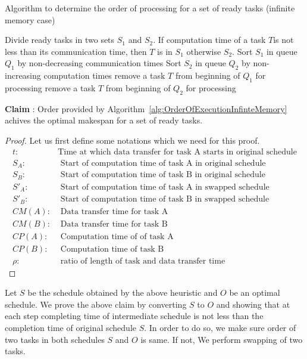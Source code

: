 \documentclass[runningheads]{llncs} %
\begin{document}
	
	\begin{algorithm}
	\caption{\label{alg:OrderOfExecutionInfinteMemory}Algorithm to determine the order of processing for a set of ready tasks (infinite memory case)}
	\begin{algorithmic}[1]
		\STATE Divide ready tasks in two sets $S_1$ and $S_2$. If computation time of a task $T$is not less than its communication time, then $T$ is in $S_1$ otherwise $S_2$.
		\STATE Sort $S_1$ in queue $Q_1$ by non-decreasing communication times
		\STATE Sort $S_2$ in queue $Q_2$ by non-increasing computation times
		\STATE remove a task $T$ from beginning of $Q_1$ for processing
		\ELSE 
		\STATE remove a task $T$ from beginning of $Q_2$ for processing
		\ENDIF
		\ENDWHILE
	\end{algorithmic}
\end{algorithm}
	
	
	\noindent \textbf{Claim} : Order provided by Algorithm~\ref{alg:OrderOfExecutionInfinteMemory} achives the optimal makespan for a set of ready tasks.
	\begin{proof}
		Let us first define some notations which we need for this proof.
		\begin{align*}
		t : & \text{Time at which data transfer for task A starts in original schedule}\\
		S_A : & \text{ Start of computation  time of task A in original schedule}\\
		S_B : & \text{ Start of computation time of task B in original schedule}\\
		S'_A : & \text{ Start of computation time of task A in swapped schedule}\\
		S'_B : & \text{ Start of computation time of task B in swapped schedule}\\
		CM(A) : & \text{ Data transfer time for task A}\\
		CM(B) : & \text{ Data transfer time for task B}\\
		CP(A) : & \text{ Computation time of of task A}\\
		CP(B) : & \text{ Computation time of task B}\\
		\rho : & \text{ ratio of length of task and data transfer time}
		\end{align*}
	\end{proof}
	
	Let $S$ be the schedule obtained by the above heuristic and $O$ be an optimal schedule. We prove the above claim by converting $S$ to $O$ and showing that at each step completing time of intermediate schedule is not less than the completion time of original schedule $S$. In order to do so, we make sure order of two tasks in both schedules $S$ and $O$ is same. If not, We perform swapping of two tasks.
	
\end{document}
